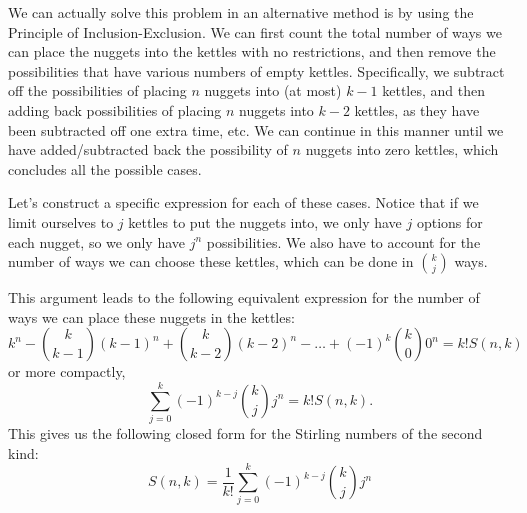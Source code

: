 We can actually solve this problem in an alternative method is by using the Principle of Inclusion-Exclusion. We can first count the total number of ways we can place the nuggets into the kettles with no restrictions, and then remove the possibilities that have various numbers of empty kettles. Specifically, we subtract off the possibilities of placing $n$ nuggets into (at most) $k-1$ kettles, and then adding back possibilities of placing $n$ nuggets into $k-2$ kettles, as they have been subtracted off one extra time, etc. We can continue in this manner until we have added/subtracted back the possibility of $n$ nuggets into zero kettles, which concludes all the possible cases. 

Let's construct a specific expression for each of these cases. Notice that if we limit ourselves to $j$ kettles to put the nuggets into, we only have $j$ options for each nugget, so we only have $j^n$ possibilities. We also have to account for the number of ways we can choose these kettles, which can be done in $\binom{k}{j}$ ways. 

This argument leads to the following equivalent expression for the number of ways we can place these nuggets in the kettles:  
\[
	k^n - \binom{k}{k-1}(k-1)^n + \binom{k}{k-2}(k-2)^n - \ldots + (-1)^k \binom{k}{0} 0^n = k! S(n, k)
\]
or more compactly, 
\[
	\sum_{j=0}^k (-1)^{k-j} \binom{k}{j} j^n = k! S(n, k). 
\]
This gives us the following closed form for the Stirling numbers of the second kind: 
\[
	S(n, k) = \frac{1}{k!} \sum_{j=0}^k (-1)^{k-j} \binom{k}{j} j^n 
\]
